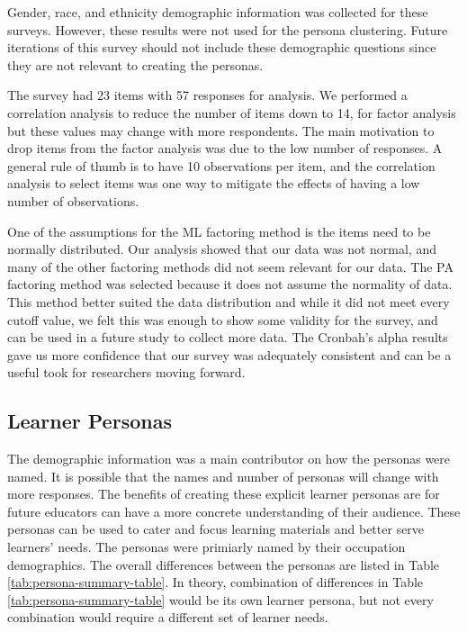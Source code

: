 \documentclass[020-persona\_validation.tex]{subfiles}
\begin{document}
        Gender, race, and ethnicity demographic information was collected for these surveys.
        However, these results were not used for the persona clustering.
        Future iterations of this survey should not include these
        demographic questions since they are not relevant to creating the personas.

        The survey had 23 items with 57 responses for analysis.
        We performed a correlation analysis to reduce the number of items down to 14, for factor analysis
        but these values may change with more respondents.
        The main motivation to drop items from the factor analysis was due to the low number of responses.
        A general rule of thumb is to have 10 observations per item,
        and the correlation analysis to select items was one way to mitigate the effects of having a low number of observations.

        One of the assumptions for the ML factoring method is the items need to be normally distributed.
        Our analysis showed that our data was not normal,
        and many of the other factoring methods did not seem relevant for our data.
        The PA factoring method was selected because it does not assume the normality of data.
        This method better suited the data distribution and
        while it did not meet every cutoff value,
        we felt this was enough to show some validity for the survey,
        and can be used in a future study to collect more data.
        The Cronbah's alpha results gave us more confidence that our survey was adequately consistent and
        can be a useful took for researchers moving forward.

    \subsection{Learner Personas}

        The demographic information was a main contributor on how the personas were named.
        It is possible that the names and number of personas will change with more responses.
        The benefits of creating these explicit learner personas are for future educators
        can have a more concrete understanding of their audience.
        These personas can be used to cater and focus learning materials and better serve learners' needs.
        The personas were primiarly named by their occupation demographics.
        The overall differences between the personas are listed in Table \ref{tab:persona-summary-table}.
        In theory, combination of differences in Table \ref{tab:persona-summary-table} would be its own learner persona,
        but not every combination would require a different set of learner needs.
\end{document}
